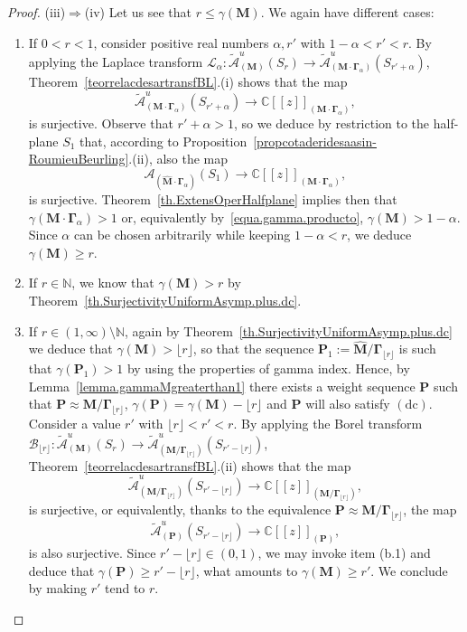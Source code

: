 \documentclass[11pt,a4paper]{article}
\theoremstyle{plain}
\theoremstyle{definition}
\numberwithin{equation}{section}
\newcommand{\CC}{\mathbb{C}}
\newcommand{\N}{\mathbb{N}}
\newcommand{\al}{\alpha}
\newcommand{\M}{{\boldsymbol{M}}}
\newcommand{\bGa}{{\boldsymbol{\Gamma}}}
\newcommand{\hM}{\widehat{{\boldsymbol{M}}}}
\newcommand{\dc}{\operatorname{(dc)}}
\begin{document}
\begin{proof}
	(iii)$\Rightarrow$(iv) Let us see that $r\leq \gamma(\M)$. We again have different cases:
\begin{enumerate}[({b}.1)]
	\item If $0<r<1$, consider positive real numbers $\al,r'$ with $1-\al<r'<r$. By applying the Laplace transform $\mathcal{L}_{\al}\colon \widetilde{\mathcal{A}}^{u}_{(\M)}(S_{r})\to \widetilde{\mathcal{A}}^{u}_{(\M\cdot\bGa_{\al})}(S_{r'+\al})$, Theorem~\ref{teorrelacdesartransfBL}.(i) shows that the map
	$$
	 \widetilde{\mathcal{A}}^u_{(\M\cdot\bGa_{\al})}(S_{r'+\al})\to\CC[[z]]_{(\M\cdot\bGa_{\al})},
	$$
	 is surjective. Observe that $r'+\al>1$, so we deduce by restriction to the half-plane $S_1$ that, according to Proposition~\ref{propcotaderidesaasin-RoumieuBeurling}.(ii), also the map
	 $$
	 	 \mathcal{A}_{(\hM\cdot\bGa_{\al})}(S_1)\to\CC[[z]]_{(\M\cdot\bGa_{\al})},
	 $$
	 is surjective. Theorem~\ref{th.ExtensOperHalfplane} implies then that $\gamma(\M\cdot\bGa_{\al})>1$ or, equivalently by~\eqref{equa.gamma.producto}, $\gamma(\M)>1-\al$. Since $\al$ can be chosen arbitrarily while keeping $1-\al<r$, we deduce $\gamma(\M)\ge r$.
	\item If $r\in\N$, we know that $\gamma(\M)>r$ by Theorem~\ref{th.SurjectivityUniformAsymp.plus.dc}.
	\item If $r\in(1,\infty)\setminus\N$, again by Theorem~\ref{th.SurjectivityUniformAsymp.plus.dc} we deduce that $\gamma(\M)>\lfloor r\rfloor$, so that the sequence $\boldsymbol{P}_1:=\hM/\bGa_{\lfloor r\rfloor}$ is such that $\gamma(\boldsymbol{P}_1)>1$ by using the properties of gamma index. %
	Hence, by Lemma~\ref{lemma.gammaMgreaterthan1} there exists a weight sequence $\boldsymbol{P}$ such that $\boldsymbol{P}\approx\M/\bGa_{\lfloor r\rfloor}$, $\gamma(\boldsymbol{P})=\gamma(\M)-{\lfloor r\rfloor}$ and  $\boldsymbol{P}$ will also satisfy $\dc$. Consider a value $r'$ with $\lfloor r\rfloor<r'<r$. By applying the Borel transform $\mathcal{B}_{\lfloor r\rfloor}\colon \widetilde{\mathcal{A}}^{u}_{(\M)}(S_{r})\to \widetilde{\mathcal{A}}^{u}_{(\M/\bGa_{\lfloor r\rfloor})} (S_{r'-\lfloor r\rfloor})$, Theorem~\ref{teorrelacdesartransfBL}.(ii) shows that the map
	$$
	\widetilde{\mathcal{A}}^{u}_{(\M/\bGa_{\lfloor r\rfloor})} (S_{r'-\lfloor r\rfloor})\to\CC[[z]]_{(\M/\bGa_{\lfloor r\rfloor})},
	$$
	is surjective, or equivalently, thanks to the equivalence $\boldsymbol{P}\approx\M/\bGa_{\lfloor r\rfloor}$, the map
	$$
	\widetilde{\mathcal{A}}^{u}_{(\boldsymbol{P})} (S_{r'-\lfloor r\rfloor})\to\CC[[z]]_{(\boldsymbol{P})},
	$$
	is also surjective. Since $ r'-\lfloor r\rfloor\in(0,1)$, we may invoke item (b.1) and deduce that $\gamma(\boldsymbol{P})\ge r'-\lfloor r\rfloor$, what amounts to $\gamma(\M)\ge r'$. We conclude by making $r'$ tend to $r$.
\end{enumerate}
\end{proof}
\end{document}
